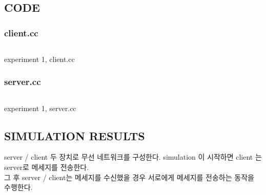 \vspace{-6mm}
\section{}
    \vspace{-3mm}
    \subsection{CODE}
    \vspace{-3mm}
        \subsubsection{client.cc}
            \vspace{-2mm}
            \begin{listing}[h!]
            \inputminted[framerule = 1pt,framesep = 2mm , frame = lines, fontsize=\footnotesize]{c}{./code/week10/Experiment01/client.cpp}
            \vspace{-3mm}
            \caption{\footnotesize experiment 1, client.cc}
            \end{listing}
            \vspace{-6mm}
        \subsubsection{server.cc}
            \vspace{-2mm}
            \begin{listing}[h!]
            \inputminted[framerule = 1pt,framesep = 2mm , frame = lines, fontsize=\footnotesize]{c}{./code/week10/Experiment01/server.cpp}
            \vspace{-3mm}
            \caption{\footnotesize experiment 1, server.cc}
            \end{listing}
            \vspace{-6mm}
\clearpage
    \subsection{SIMULATION RESULTS}
    \vspace{-1mm}
    server / client 두 장치로 무선 네트워크를 구성한다.  simulation 이 시작하면 client 는 server로 메세지를 전송한다.\\
    그 후 server / client는 메세지를 수신했을 경우 서로에게 메세지를 전송하는 동작을 수행한다. 
    \vspace{-3mm}
